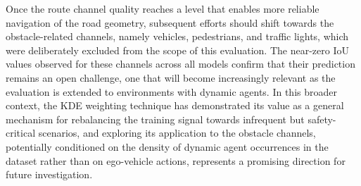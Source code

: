 \documentclass[12pt]{article}
\begin{document}
Once the route channel quality reaches a level that enables more reliable navigation of the road geometry, subsequent efforts should shift towards the obstacle-related channels, namely vehicles, pedestrians, and traffic lights, which were deliberately excluded from the scope of this evaluation. The near-zero IoU values observed for these channels across all models confirm that their prediction remains an open challenge, one that will become increasingly relevant as the evaluation is extended to environments with dynamic agents. In this broader context, the KDE weighting technique has demonstrated its value as a general mechanism for rebalancing the training signal towards infrequent but safety-critical scenarios, and exploring its application to the obstacle channels, potentially conditioned on the density of dynamic agent occurrences in the dataset rather than on ego-vehicle actions, represents a promising direction for future investigation.



%
%
%


%
\end{document}

